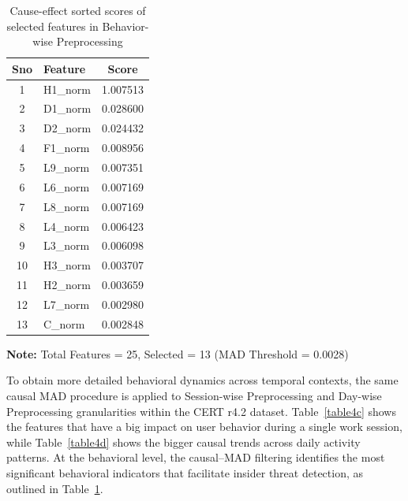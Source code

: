 \begin{table}[!ht]
\centering
\caption{Cause-effect sorted scores of selected features in Behavior-wise Preprocessing}
\label{table4b}
\begin{tabular}{clc}
\toprule
\textbf{Sno} & \textbf{Feature} & \textbf{Score} \\
\midrule
1 & H1\_norm & 1.007513 \\
2 & D1\_norm & 0.028600 \\
3 & D2\_norm & 0.024432 \\
4 & F1\_norm & 0.008956 \\
5 & L9\_norm & 0.007351 \\
6 & L6\_norm & 0.007169 \\
7 & L8\_norm & 0.007169 \\
8 & L4\_norm & 0.006423 \\
9 & L3\_norm & 0.006098 \\
10 & H3\_norm & 0.003707 \\
11 & H2\_norm & 0.003659 \\
12 & L7\_norm & 0.002980 \\
13 & C\_norm & 0.002848 \\
\bottomrule
\end{tabular}
\vspace{0.2cm}

\scriptsize{\textbf{Note:} Total Features = 25, Selected = 13 (MAD Threshold = 0.0028)}
\end{table}
To obtain more detailed behavioral dynamics across temporal contexts, the same causal MAD procedure is applied to Session-wise Preprocessing and Day-wise Preprocessing granularities within the CERT r4.2 dataset.  Table~\ref{table4c} shows the features that have a big impact on user behavior during a single work session, while Table~\ref{table4d} shows the bigger causal trends across daily activity patterns.  At the behavioral level, the causal–MAD filtering identifies the most significant behavioral indicators that facilitate insider threat detection, as outlined in Table~\ref{table4b}. 



